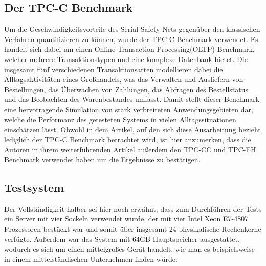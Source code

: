 \subsection{Der TPC-C Benchmark}
Um die Geschwindigkeitsvorteile des Serial Safety Nets gegenüber den klassischen Verfahren quantifizieren zu können, wurde der TPC-C Benchmark verwendet.\cite{tpcc}
Es handelt sich dabei um einen Online-Transaction-Processing(OLTP)-Benchmark, welcher mehrere Transaktionstypen und eine komplexe Datenbank bietet.
Die insgesamt fünf verschiedenen Transaktionsarten modellieren dabei die Alltagsaktivitäten eines Großhandels, was das Verwalten und Ausliefern von Bestellungen, das Überwachen von Zahlungen, das Abfragen des Bestellstatus und das Beobachten des Warenbestandes umfasst.
Damit stellt dieser Benchmark eine hervorragende Simulation von stark verbreiteten Anwendungsgebieten dar, welche die Performanz des getesteten Systems in vielen Alltagssituationen einschätzen lässt.
Obwohl in dem Artikel, auf den sich diese Ausarbeitung bezieht \cite{Wang:2015} lediglich der TPC-C Benchmark betrachtet wird, ist hier anzumerken, dass die Autoren in ihrem weiterführenden Artikel \cite{WangJFP16} außerdem den TPC-CC und TPC-EH Benchmark verwendet haben um die Ergebnisse zu bestätigen.

\subsection{Testsystem}
Der Vollständigkeit halber sei hier noch erwähnt, dass zum Durchführen der Tests ein Server mit vier Sockeln verwendet wurde, der mit vier Intel Xeon E7-4807 Prozessoren bestückt war und somit über insgesamt 24 physikalische Rechenkerne verfügte.
Außerdem war das System mit 64GB Hauptspeicher ausgestattet, wodurch es sich um einen mittelgroßes Gerät handelt, wie man es beispielsweise in einem mittelständischen Unternehmen finden würde.

